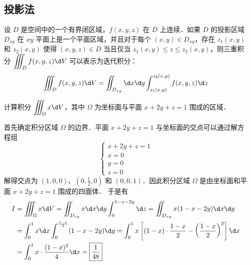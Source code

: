 \documentclass[12pt, a4paper, oneside, UTF8]{ctexbook}
\begin{document}
\subsection{投影法}
\begin{theorem}
设 $D$ 是空间中的一个有界闭区域，$f(x,y,z)$ 在 $D$ 上连续．如果 $D$ 的投影区域 $D_{xy}$ 在 $xy$ 平面上是一个平面区域，并且对于每个 $(x,y) \in D_{xy}$，存在 $z_1(x,y)$ 和 $z_2(x,y)$ 使得 $(x,y,z) \in D$ 当且仅当 $z_1(x,y) \le z \le z_2(x,y)$，则三重积分 $\displaystyle\iiint_D f(x,y,z) \d V$ 可以表示为迭代积分：
\[\iiint_D f(x,y,z) \d V = \iint_{D_{xy}}\d x\d y\int_{z_1(x,y)}^{z_2(x,y)} f(x,y,z) \d z\]
\end{theorem}
\begin{example}
    计算积分 $\displaystyle\iiint_\Omega x \d V$，其中 $\Omega$ 为坐标面与平面 $x+2y+z=1$ 围成的区域．
\end{example}
\begin{solution}
首先确定积分区域 $\Omega$ 的边界．平面 $x+2y+z=1$ 与坐标面的交点可以通过解方程组
\[\begin{cases}
x + 2y + z = 1 \\
x = 0 \\
y = 0 \\
z = 0
\end{cases}\]
解得交点为 $(1,0,0)$、$(0,\frac{1}{2},0)$ 和 $(0,0,1)$．因此积分区域 $\Omega$ 是由坐标面和平面 $x+2y+z=1$ 围成的四面体．
于是有
\begin{align*}
    I &= \iiint_\Omega x \d V = \iint_{D_{xy}}x \d x\d y \int_0^{1-x-2y}  \d z = \iint_{D_{xy}} x(1-x-2y) \d x\d y \\
      &= \int_{0}^{1} x\d x \int_0^{\frac{1-x}{2}} (1-x-2y) \d y = \int_0^1 x\left[ (1-x)\cdot\frac{1-x}{2} - \left(\frac{1-x}{2}\right)^2\right] \d x\\
      &= \int_{0}^{1} x \cdot \frac{(1-x)^2}{4} \d x = \boxed{\frac{1}{48}}
\end{align*}
\end{solution}
\end{document}
